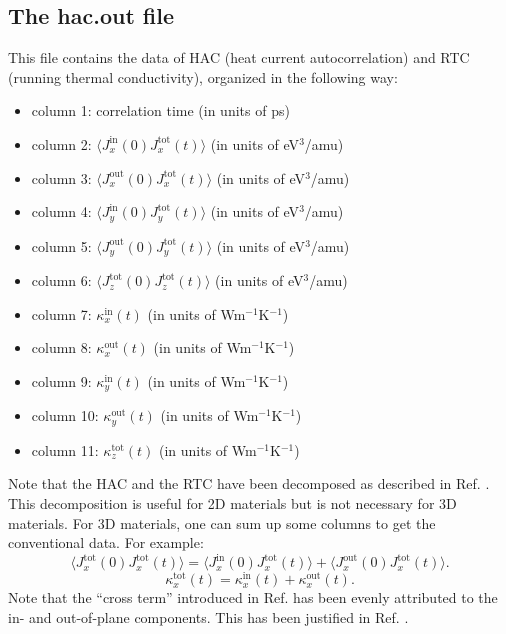 \documentclass[12pt,a4paper]{report}
\begin{document}
\subsection{The hac.out file}

This file contains the data of HAC (heat current autocorrelation) and RTC (running thermal conductivity), organized in the following way:
\begin{itemize}
\item column 1: correlation time (in units of ps)
\item column 2: $\langle J_x^{\text{in}}(0)J_x^{\text{tot}}(t)\rangle$ (in units of eV$^3$/amu)
\item column 3: $\langle J_x^{\text{out}}(0)J_x^{\text{tot}}(t)\rangle$ (in units of eV$^3$/amu)
\item column 4: $\langle J_y^{\text{in}}(0)J_y^{\text{tot}}(t)\rangle$ (in units of eV$^3$/amu)
\item column 5: $\langle J_y^{\text{out}}(0)J_y^{\text{tot}}(t)\rangle$ (in units of eV$^3$/amu)
\item column 6: $\langle J_z^{\text{tot}}(0)J_z^{\text{tot}}(t)\rangle$ (in units of eV$^3$/amu)
\item column 7: $\kappa_x^{\text{in}}(t)$ (in units of Wm$^{-1}$K$^{-1}$)
\item column 8: $\kappa_x^{\text{out}}(t)$ (in units of Wm$^{-1}$K$^{-1}$)
\item column 9: $\kappa_y^{\text{in}}(t)$ (in units of Wm$^{-1}$K$^{-1}$)
\item column 10: $\kappa_y^{\text{out}}(t)$ (in units of Wm$^{-1}$K$^{-1}$)
\item column 11: $\kappa_z^{\text{tot}}(t)$ (in units of Wm$^{-1}$K$^{-1}$)
\end{itemize}

Note that the HAC and the RTC have been decomposed as described in Ref. \cite{fan2017prb}. This decomposition is useful for 2D materials but is not necessary for 3D materials. For 3D materials, one can sum up some columns to get the conventional data. For example:
\begin{equation}
\langle J_x^{\text{tot}}(0)J_x^{\text{tot}}(t) \rangle =
\langle J_x^{\text{in}}(0)J_x^{\text{tot}}(t) \rangle +
\langle J_x^{\text{out}}(0)J_x^{\text{tot}}(t) \rangle.
\end{equation}
\begin{equation}
\kappa_x^{\text{tot}}(t) = \kappa_x^{\text{in}}(t) + \kappa_x^{\text{out}}(t).
\end{equation}
Note that the ``cross term'' introduced in Ref. \cite{fan2017prb} has been evenly attributed to the in- and out-of-plane components. This has been justified in Ref. \cite{fan2018submitted}.
\end{document}
